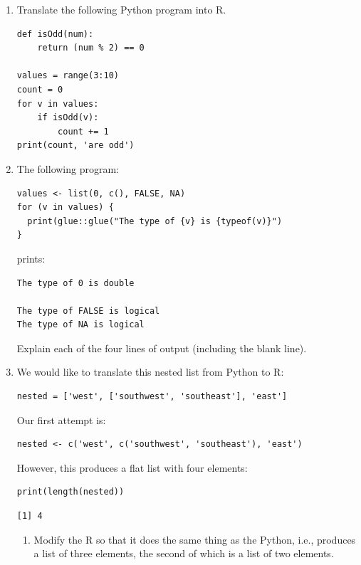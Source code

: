 \begin{enumerate}

\item
Translate the following Python program into R.

\begin{lstlisting}
def isOdd(num):
    return (num % 2) == 0

values = range(3:10)
count = 0
for v in values:
    if isOdd(v):
        count += 1
print(count, 'are odd')
\end{lstlisting}

\item
The following program:

\begin{lstlisting}
values <- list(0, c(), FALSE, NA)
for (v in values) {
  print(glue::glue("The type of {v} is {typeof(v)}")
}
\end{lstlisting}

\noindent
prints:

\begin{lstlisting}
The type of 0 is double
  
The type of FALSE is logical
The type of NA is logical
\end{lstlisting}

Explain each of the four lines of output (including the blank line).

\item
We would like to translate this nested list from Python to R:

\begin{lstlisting}
nested = ['west', ['southwest', 'southeast'], 'east']
\end{lstlisting}

\noindent
Our first attempt is:

\begin{lstlisting}
nested <- c('west', c('southwest', 'southeast'), 'east')
\end{lstlisting}

However, this produces a flat list with four elements:

\begin{lstlisting}
print(length(nested))
\end{lstlisting}

\begin{lstlisting}
[1] 4
\end{lstlisting}

\begin{enumerate}

\item
  Modify the R so that it does the same thing as the Python,
  i.e.,
  produces a list of three elements,
  the second of which is a list of two elements.


\end{enumerate}
\end{enumerate}
